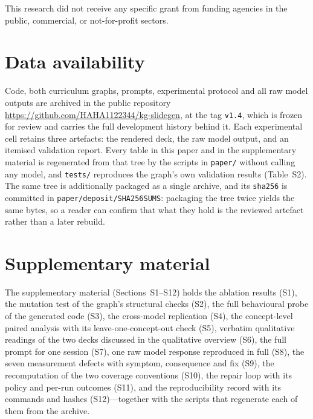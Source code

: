 \documentclass[review,12pt]{elsarticle}
\renewcommand{\_}{\kgunderscore\allowbreak}
\newcommand{\id}[1]{\texttt{#1}}
\begin{document}
This research did not receive any specific grant from funding agencies in the
public, commercial, or not-for-profit sectors.


\section*{Data availability}

Code, both curriculum graphs, prompts, experimental protocol and all raw model
outputs are archived in the public repository
\url{https://github.com/HAHA1122344/kg-slidegen}, at the tag \id{v1.4}, which is
frozen for review and carries the full development history behind it. Each
experimental cell retains three artefacts: the rendered deck, the raw model
output, and an itemised validation report. Every table in this paper and in the
supplementary material is regenerated from that tree by the scripts in
\id{paper/} without calling any model, and \id{tests/} reproduces the graph's own
validation results (Table~S2). The same tree is additionally packaged as a single
archive, and its \id{sha256} is committed in \id{paper/deposit/SHA256SUMS}:
packaging the tree twice yields the same bytes, so a reader can confirm that what
they hold is the reviewed artefact rather than a later rebuild.

\section*{Supplementary material}

The supplementary material (Sections~S1--S12) holds the ablation results (S1),
the mutation test of the graph's structural checks (S2), the full behavioural
probe of the generated code (S3), the cross-model replication (S4), the
concept-level paired analysis with its leave-one-concept-out check (S5),
verbatim qualitative readings of the two decks discussed in the qualitative
overview (S6), the full prompt for one session (S7), one raw model response
reproduced in full (S8), the seven measurement defects with symptom, consequence
and fix (S9), the recomputation of the two coverage conventions (S10), the repair
loop with its policy and per-run outcomes (S11), and the reproducibility record
with its commands and hashes (S12)---together with the scripts that regenerate
each of them from the archive.




\end{document}
